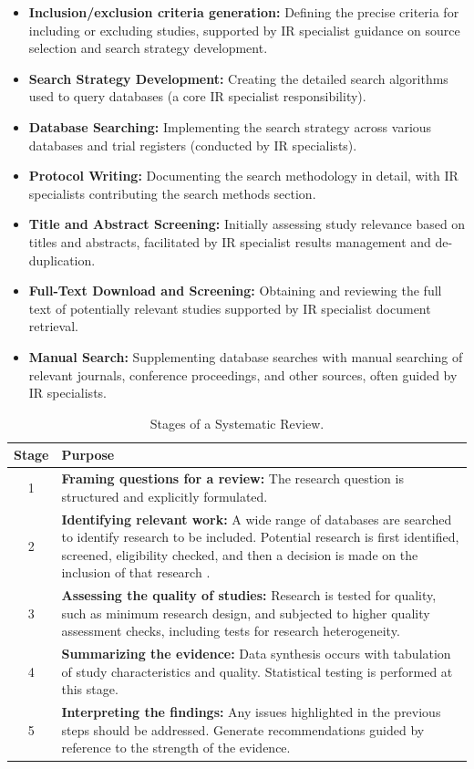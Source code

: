 \documentclass[10pt,oneside]{book}
\begin{document}
\begin{itemize}
\item {\bf{Inclusion/exclusion criteria generation:}} Defining the precise criteria for including or excluding studies, supported by IR specialist guidance on source selection and search strategy development.
\item {\bf{Search Strategy Development:}} Creating the detailed search algorithms used to query databases (a core IR specialist responsibility).
\item {\bf{Database Searching:}} Implementing the search strategy across various databases and trial registers (conducted by IR specialists).
\item {\bf{Protocol Writing:}} Documenting the search methodology in detail, with IR specialists contributing the search methods section.
\item {\bf{Title and Abstract Screening:}} Initially assessing study relevance based on titles and abstracts, facilitated by IR specialist results management and de-duplication.
\item {\bf{Full-Text Download and Screening:}} Obtaining and reviewing the full text of potentially relevant studies supported by IR specialist document retrieval.
\item {\bf{Manual Search:}} Supplementing database searches with manual searching of relevant journals, conference proceedings, and other sources, often guided by IR specialists.
\end{itemize}



\begin{table}[t]
\centering
\small
\begin{tabular}{|c|p{}|}
\hline
\textbf{Stage} & \textbf{Purpose} \\
\hline
1 & \textbf{Framing questions for a review:} The research question is structured and explicitly formulated. \\\hline
2 & \textbf{Identifying relevant work:} A wide range of databases are searched to identify research to be included. Potential research is first identified, screened, eligibility checked, and then a decision is made on the inclusion of that research \cite{tawfik_step_2019}. \\\hline
3 & \textbf{Assessing the quality of studies:} Research is tested for quality, such as minimum research design, and subjected to higher quality assessment checks, including tests for research heterogeneity. \\\hline
4 & \textbf{Summarizing the evidence:} Data synthesis occurs with tabulation of study characteristics and quality. Statistical testing is performed at this stage. \\\hline
5 & \textbf{Interpreting the findings:} Any issues highlighted in the previous steps should be addressed. Generate recommendations guided by reference to the strength of the evidence. \\
\hline
\end{tabular}
\caption{Stages of a Systematic Review.}
\label{tab:stages_of_systematic review}
\end{table}
\end{document}
